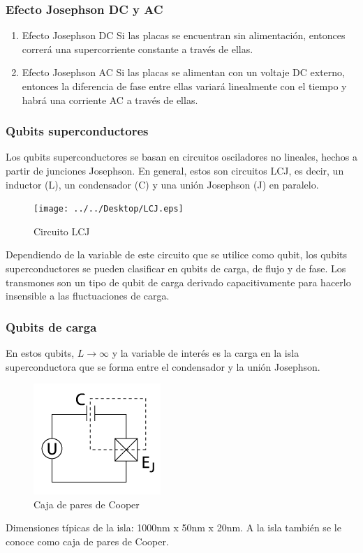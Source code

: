 \documentclass[xetex,mathserif,serif, 8pt]{beamer}
\begin{document}
\begin{frame}
    \frametitle{Efecto Josephson DC y AC}

    \begin{enumerate}
        \item Efecto Josephson DC
            Si las placas se encuentran sin alimentación, entonces correrá una supercorriente constante a través de ellas.
            \vspace{0.5cm}

        \item Efecto Josephson AC
            Si las placas se alimentan con un voltaje DC externo, entonces la diferencia de fase entre ellas variará linealmente con el tiempo y habrá una corriente AC
a través de ellas.
    \end{enumerate}

\end{frame}

\begin{frame}
    \frametitle{Qubits superconductores}
    \justify
    Los qubits superconductores se basan en circuitos osciladores no lineales, hechos a partir de junciones Josephson. En general, estos son circuitos LCJ, es decir, un inductor (L), un condensador (C) y una unión Josephson (J) en paralelo.
    
    \begin{figure}[H]
    \centering \texttt{[image: ../../Desktop/LCJ.eps]}
    \caption{Circuito LCJ \cite{wendin}}
    \label{fig:JJ}
    \end{figure}
	
    \justify
    Dependiendo de la variable de este circuito que se utilice como qubit, los qubits superconductores se pueden clasificar en qubits de carga, de flujo y de fase. Los transmones son un tipo de qubit de carga derivado capacitivamente para hacerlo insensible a las fluctuaciones de carga. 
\end{frame}

\begin{frame}
    \frametitle{Qubits de carga}

    En estos qubits, $L \to \infty$ y la variable de interés es la carga en la isla superconductora que se forma entre el condensador y la unión Josephson. 
	
    \begin{figure}[H]
    \centering \includegraphics[width=0.3\linewidth]{md/Avance1/cooperpairbox.png}
    \caption{Caja de pares de Cooper \cite{Bjohnson00}}
    \label{fig:cooperpairbox}
    \end{figure}
	
	Dimensiones típicas de la isla: 1000nm x 50nm x 20nm. A la isla también se le conoce como caja de pares de Cooper. 

\end{frame}
\end{document}
